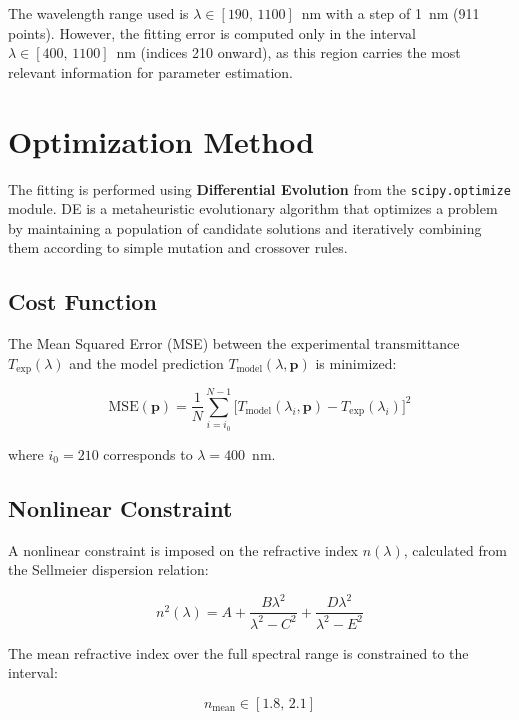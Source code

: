 \documentclass[12pt,a4paper]{article}
\begin{document}
The wavelength range used is $\lambda \in [190,\,1100]$~nm with a step of 1~nm (911 points). However, the fitting error is computed only in the interval $\lambda \in [400,\,1100]$~nm (indices 210 onward), as this region carries the most relevant information for parameter estimation.

\section{Optimization Method}

The fitting is performed using \textbf{Differential Evolution} from the \texttt{scipy.optimize} module. DE is a metaheuristic evolutionary algorithm that optimizes a problem by maintaining a population of candidate solutions and iteratively combining them according to simple mutation and crossover rules.

\subsection{Cost Function}

The Mean Squared Error (MSE) between the experimental transmittance $T_{\text{exp}}(\lambda)$ and the model prediction $T_{\text{model}}(\lambda, \mathbf{p})$ is minimized:

\begin{equation}
\text{MSE}(\mathbf{p}) = \frac{1}{N} \sum_{i = i_0}^{N-1} \bigl[ T_{\text{model}}(\lambda_i, \mathbf{p}) - T_{\text{exp}}(\lambda_i) \bigr]^2
\label{eq:mse}
\end{equation}

where $i_0 = 210$ corresponds to $\lambda = 400$~nm.

\subsection{Nonlinear Constraint}

A nonlinear constraint is imposed on the refractive index $n(\lambda)$, calculated from the Sellmeier dispersion relation:

\begin{equation}
n^2(\lambda) = A + \frac{B \lambda^2}{\lambda^2 - C^2} + \frac{D \lambda^2}{\lambda^2 - E^2}
\end{equation}

The mean refractive index over the full spectral range is constrained to the interval:

\begin{equation}
n_{\text{mean}} \in [1.8,\, 2.1]
\end{equation}
\end{document}
